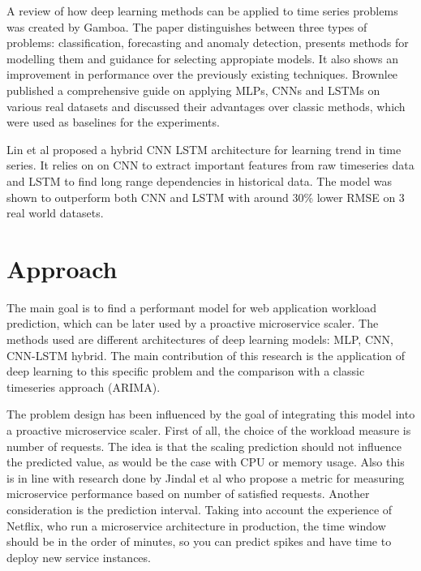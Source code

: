\documentclass[12pt]{article}
\begin{document}
  A review of how deep learning methods can be applied to time series problems was created by Gamboa\cite{dl_ts}.
  The paper distinguishes between three types of problems: classification, forecasting and anomaly detection, presents
  methods for modelling them and guidance for selecting appropiate models. It also shows an improvement
  in performance over the previously existing techniques. Brownlee\cite{dlts_book} published a 
  comprehensive guide on applying MLPs, CNNs and LSTMs on various real datasets and discussed their 
  advantages over classic methods, which were used as baselines for the experiments. 

  Lin et al\cite{cnn_lstm} proposed a hybrid CNN LSTM architecture for learning trend in time series.
  It relies on on CNN to extract important features from raw timeseries data and LSTM to 
  find long range dependencies in historical data. The model was shown to outperform both CNN and LSTM 
  with around 30\% lower RMSE on 3 real world datasets.
  
  \section{Approach}
  The main goal is to find a performant model for web application 
  workload prediction, which can be later used by a proactive 
  microservice scaler. The methods used are different architectures
  of deep learning models: MLP, CNN, CNN-LSTM hybrid. The main 
  contribution of this research is the application of deep learning 
  to this specific problem and the comparison with a classic timeseries
  approach (ARIMA).

  The problem design has been influenced by the goal of integrating
  this model into a proactive microservice scaler. First of all,
  the choice of the workload measure is number of requests. The idea
  is that the scaling prediction should not influence the predicted 
  value, as would be the case with CPU or memory usage. Also this is 
  in line with research done by Jindal et al\cite{msc} who propose 
  a metric for measuring microservice performance based on number of 
  satisfied requests. Another consideration is the prediction interval.
  Taking into account the experience of Netflix\cite{scryer}, who run 
  a microservice architecture in production, the time window should be in 
  the order of minutes, so you can predict spikes and have time to deploy
  new service instances.
\end{document}
